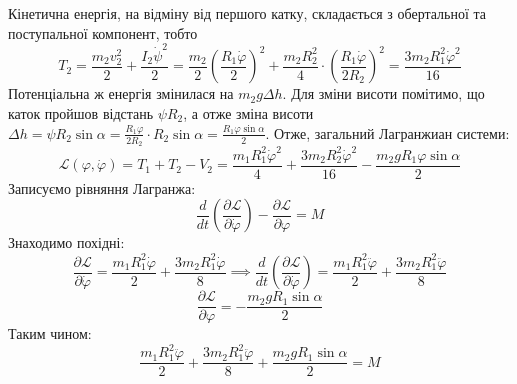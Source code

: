 \documentclass[14pt]{extarticle}
\begin{document}
Кінетична енергія, на відміну від першого катку, складається з обертальної та поступальної компонент, тобто
\[
T_2=\frac{m_2v_2^2}{2}+\frac{I_2\dot{\psi}^2}{2} = \frac{m_2}{2}\left(\frac{R_1\dot{\varphi}}{2}\right)^2 + \frac{m_2R_2^2}{4} \cdot \left(\frac{R_1\dot{\varphi}}{2R_2}\right)^2 = \frac{3m_2R_1^2\dot{\varphi}^2}{16}
\]
Потенціальна ж енергія змінилася на $m_2g\Delta h$. Для зміни висоти помітимо, що каток пройшов відстань $\psi R_2$, а отже зміна висоти $\Delta h = \psi R_2 \sin\alpha=\frac{R_1\varphi}{2R_2} \cdot R_2\sin\alpha=\frac{R_1\varphi\sin\alpha}{2}$. Отже, загальний Лагранжиан системи:
\[
\mathcal{L}(\varphi,\dot{\varphi}) = T_1+T_2-V_2 = \frac{m_1R_1^2\dot{\varphi}^2}{4} + \frac{3m_2R_2^2\dot{\varphi}^2}{16} - \frac{m_2gR_1\varphi\sin\alpha}{2}
\]
Записуємо рівняння Лагранжа:
\[
\frac{d}{dt}\left(\frac{\partial\mathcal{L}}{\partial\dot{\varphi}}\right) - \frac{\partial \mathcal{L}}{\partial\varphi} = M
\]
Знаходимо похідні:
\[
\frac{\partial\mathcal{L}}{\partial\dot{\varphi}} = \frac{m_1R_1^2\dot{\varphi}}{2} + \frac{3m_2R_1^2\dot{\varphi}}{8} \implies \frac{d}{dt}\left(\frac{\partial\mathcal{L}}{\partial\dot{\varphi}}\right) = \frac{m_1R_1^2\ddot{\varphi}}{2} + \frac{3m_2R_1^2\ddot{\varphi}}{8}
\]
\[
\frac{\partial\mathcal{L}}{\partial\varphi} = -\frac{m_2gR_1\sin\alpha}{2}
\]
Таким чином:
\[
\frac{m_1R_1^2\ddot{\varphi}}{2} + \frac{3m_2R_1^2\ddot{\varphi}}{8} + \frac{m_2gR_1\sin\alpha}{2} = M
\]
\end{document}
